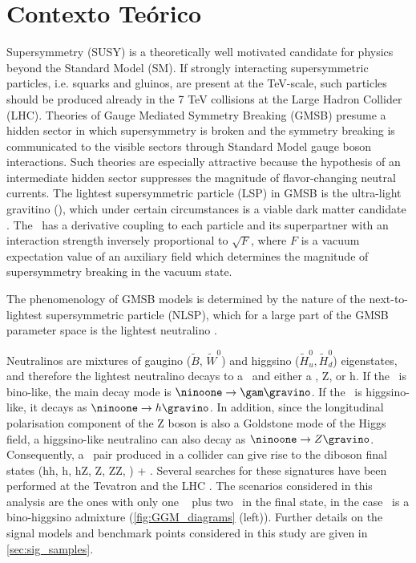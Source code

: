 \chapter{Contexto Te\'orico}

Supersymmetry (SUSY) \cite{Miyazawa:1966,Ramond:1971gb,Golfand:1971iw,Neveu:1971rx,Neveu:1971iv,Gervais:1971ji,Volkov:1973ix,Wess:1973kz,Wess:1974tw}
 is a theoretically well motivated candidate for physics beyond the Standard Model (SM). If strongly interacting supersymmetric particles, i.e.
 squarks and gluinos, are present at the TeV-scale, such particles should be produced already in the 7 TeV collisions at the Large Hadron Collider (LHC).
Theories of Gauge Mediated Symmetry Breaking (GMSB) \cite{Dine:1981gu,AlvarezGaume:1981wy,Nappi:1982hm,Dine:1993yw, Dine:1994vc,Dine:1995ag} presume a hidden sector in which supersymmetry is
broken and the symmetry breaking is communicated to the visible sectors through Standard Model gauge boson
interactions. Such theories are especially attractive because the hypothesis of an intermediate hidden sector
suppresses the magnitude of flavor-changing neutral currents. The lightest supersymmetric particle (LSP) in GMSB
is the ultra-light gravitino (\gravino), which under certain circumstances is a viable dark matter candidate \cite{Goldberg:1983nd,Ellis:1983ew}.
The \gravino\ has a derivative coupling to each particle and its superpartner with an interaction strength inversely
proportional to $\sqrt{F}$, where $F$  is a vacuum expectation value of an auxiliary field which determines the
magnitude of supersymmetry breaking in the vacuum state.

The phenomenology of GMSB models is determined by the nature of the next-to-lightest supersymmetric particle (NLSP), which for a
large part of the GMSB parameter space is the lightest neutralino \ninoone.

Neutralinos are mixtures of gaugino ($\tilde{B}$, $\tilde{W}^{0}$) and higgsino ($\tilde{H}^{0}_{u},\tilde{H}^{0}_{d}$) eigenstates, and therefore
the lightest neutralino decays to a \gravino\ and either a \gam, Z, or h. If the \ninoone\ is bino-like, the main decay mode is $\ninoone\to\gam\gravino$. If the \ninoone\ is
higgsino-like, it decays as $\ninoone\to h\gravino$. In addition, since the longitudinal polarisation component of the Z boson is also a Goldstone
mode of the Higgs field, a higgsino-like neutralino can also decay as $\ninoone\to Z\gravino$. Consequently, a \ninoone\ pair produced in a collider
can give rise to the diboson final states (hh, h\gam, hZ, Z\gam, ZZ, \gam\gam) + \etmiss. Several searches for these signatures have been performed at the
Tevatron \cite{Abazov:2007ag,Buescher:2005he} and the LHC \cite{Aad:2012zza,Aad:2012jva,Aad:2011kz,Aad2012519,leptonphoton7,Chatrchyan:2011wc,Chatrchyan:2011ah,tagkey2015503}. The scenarios considered in this analysis are the
ones with only one \gam\ %
plus two \gravino\ in the final state, in the case \ninoone\ is a bino-higgsino admixture (\Fig \ref{fig:GGM_diagrams} (left)). Further details on the signal models and benchmark points
considered in this study are given in \Sec \ref{sec:sig_samples}.

